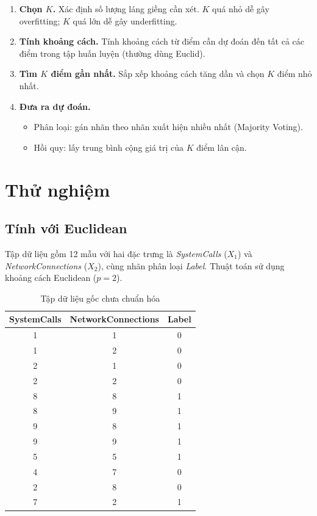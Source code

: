 \documentclass[12pt,a4paper]{article}
\begin{document}
\begin{enumerate}
    \item \textbf{Chọn $K$.} Xác định số lượng láng giềng cần xét. $K$ quá nhỏ dễ gây overfitting; $K$ quá lớn dễ gây underfitting.
    \item \textbf{Tính khoảng cách.} Tính khoảng cách từ điểm cần dự đoán đến tất cả các điểm trong tập huấn luyện (thường dùng Euclid).
    \item \textbf{Tìm $K$ điểm gần nhất.} Sắp xếp khoảng cách tăng dần và chọn $K$ điểm nhỏ nhất.
    \item \textbf{Đưa ra dự đoán.}
    \begin{itemize}
        \item Phân loại: gán nhãn theo nhãn xuất hiện nhiều nhất (Majority Voting).
        \item Hồi quy: lấy trung bình cộng giá trị của $K$ điểm lân cận.
    \end{itemize}
\end{enumerate}

\section{Thử nghiệm}
\subsection{Tính với Euclidean}
Tập dữ liệu gồm 12 mẫu với hai đặc trưng là \textit{SystemCalls} ($X_1$) và \textit{NetworkConnections} ($X_2$), cùng nhãn phân loại \textit{Label}. Thuật toán sử dụng khoảng cách Euclidean ($p = 2$).

\begin{table}[H]
    \centering
    \caption{Tập dữ liệu gốc chưa chuẩn hóa}
    \vspace{0.2cm}
    \renewcommand{\arraystretch}{1.2}
    \begin{tabular}{ccc}
        \toprule
        \textbf{SystemCalls} & \textbf{NetworkConnections} & \textbf{Label} \\
        \midrule
        1 & 1 & 0 \\
        1 & 2 & 0 \\
        2 & 1 & 0 \\
        2 & 2 & 0 \\
        8 & 8 & 1 \\
        8 & 9 & 1 \\
        9 & 8 & 1 \\
        9 & 9 & 1 \\
        5 & 5 & 1 \\
        4 & 7 & 0 \\
        2 & 8 & 0 \\
        7 & 2 & 1 \\
        \bottomrule
    \end{tabular}
\end{table}
\end{document}
